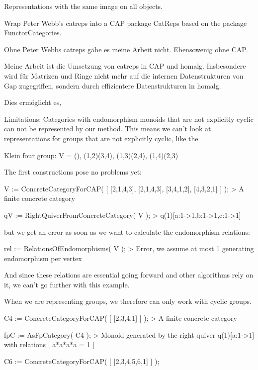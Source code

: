 \documentclass[12pt,compress]{beamer}
\begin{document}
\begin{frame}
Representations with the same image on all objects.
\end{frame}



Wrap Peter Webb's catreps into a CAP package CatReps based on the package FunctorCategories.

Ohne Peter Webbs catreps gäbe es meine Arbeit nicht. Ebensowenig ohne CAP.

Meine Arbeit ist die Umsetzung von catreps in CAP und homalg. Insbesondere wird für
Matrizen und Ringe nicht mehr auf die internen Datenstrukturen von Gap zugegriffen, sondern
durch effizientere Datenstrukturen in homalg.

Dies ermöglicht es, 





Limitations: Categories with endomorphism monoids that are not explicitly cyclic
can not be represented by our method. This means we can't look at representations
for groups that are not explicitly cyclic, like the

Klein four group: V = {(), (1,2)(3,4), (1,3)(2,4), (1,4)(2,3) }

The first constructions pose no problems yet:

V := ConcreteCategoryForCAP( [ [2,1,4,3], [2,1,4,3], [3,4,1,2], [4,3,2,1] ] );
> A finite concrete category

qV := RightQuiverFromConcreteCategory( V );
> q(1)[a:1->1,b:1->1,c:1->1]

but we get an error as soon as we want to calculate the endomorphism relations:

rel := RelationsOfEndomorphisms( V );
> Error, we assume at most 1 generating endomorphism per vertex

And since these relations are essential going forward and other algorithms rely on it,
we can't go further with this example.

When we are representing groups, we therefore can only work with cyclic groups.

C4 := ConcreteCategoryForCAP( [ [2,3,4,1] ] );
> A finite concrete category

fpC := AsFpCategory( C4 );
> Monoid generated by the right quiver q(1)[a:1->1] with relations [ a*a*a*a = 1 ]


C6 := ConcreteCategoryForCAP( [ [2,3,4,5,6,1] ] );
\end{document}
